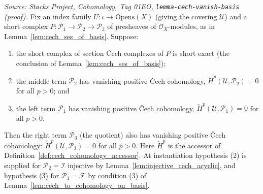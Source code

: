 \begin{lemma}\leanok
  \label{lem:quotient_vanishing_cech}
  \textit{Source: Stacks Project, Cohomology, Tag 01EO,
  \texttt{lemma-cech-vanish-basis} (proof).}
  Fix an index family \(U : \iota \to \mathrm{Opens}(X)\) (giving the covering \(\mathcal{U}\)) and a
  short complex \(P : \mathcal{P}_1 \to \mathcal{P}_2 \to \mathcal{P}_3\) of presheaves of
  \(\mathcal{O}_X\)-modules, as in Lemma~\ref{lem:cech_ses_of_basis}. Suppose:
  \begin{enumerate}
  \item the short complex of section {\v C}ech complexes of \(P\) is short exact (the conclusion of
    Lemma~\ref{lem:cech_ses_of_basis});
  \item the middle term \(\mathcal{P}_2\) has vanishing positive {\v C}ech cohomology,
    \(\check{H}^p(\mathcal{U}, \mathcal{P}_2) = 0\) for all \(p > 0\); and
  \item the left term \(\mathcal{P}_1\) has vanishing positive {\v C}ech cohomology,
    \(\check{H}^p(\mathcal{U}, \mathcal{P}_1) = 0\) for all \(p > 0\).
  \end{enumerate}
  Then the right term \(\mathcal{P}_3\) (the quotient) also has vanishing positive {\v C}ech
  cohomology: \(\check{H}^p(\mathcal{U}, \mathcal{P}_3) = 0\) for all \(p > 0\). Here
  \(\check{H}^p\) is the accessor of Definition~\ref{def:cech_cohomology_accessor}. At instantiation
  hypothesis (2) is supplied for \(\mathcal{P}_2 = \mathcal{I}\) injective by
  Lemma~\ref{lem:injective_cech_acyclic}, and hypothesis (3) for \(\mathcal{P}_1 = \mathcal{F}\) by
  condition (3) of Lemma~\ref{lem:cech_to_cohomology_on_basis}.
\end{lemma}

